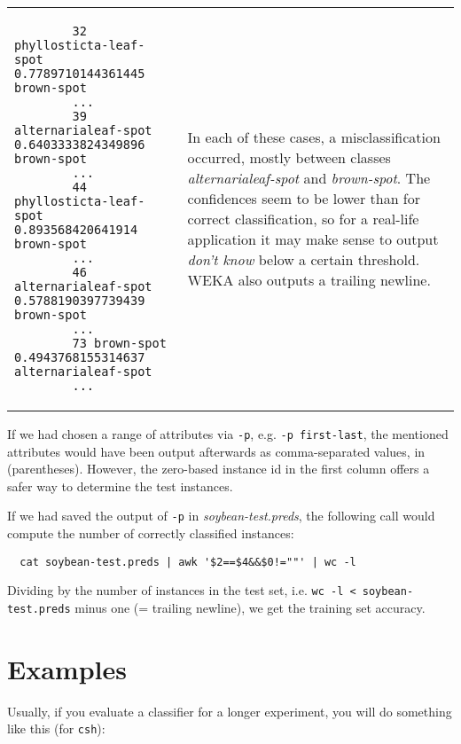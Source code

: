 \vspace{0.5cm}
\noindent
\begin{tabular}{l l}
	\begin{minipage}{8cm}
		{\scriptsize
		\begin{verbatim}
		32 phyllosticta-leaf-spot 0.7789710144361445 brown-spot
		...
		39 alternarialeaf-spot 0.6403333824349896 brown-spot
		...
		44 phyllosticta-leaf-spot 0.893568420641914 brown-spot
		...
		46 alternarialeaf-spot 0.5788190397739439 brown-spot
		...
		73 brown-spot 0.4943768155314637 alternarialeaf-spot
		...
		\end{verbatim}}
	\end{minipage}
	&
	\begin{minipage}{5cm}
	In each of these cases, a misclassification occurred, mostly between classes \textit{alternarialeaf-spot} and \textit{brown-spot}. The confidences seem to be lower than for correct classification, so for a real-life application it may make sense to output \textit{don't know} below a certain threshold. WEKA also outputs a trailing newline.
	\end{minipage}
	\\
\end{tabular}

\vspace{0.5cm}

If we had chosen a range of attributes via \texttt{-p}, e.g. \texttt{-p first-last}, the mentioned attributes would have been output afterwards as comma-separated values, in (parentheses). However, the zero-based instance id in the first column offers a safer way to determine the test instances.

If we had saved the output of \texttt{-p} in \textit{soybean-test.preds}, the following call would compute the number of correctly classified instances:

{\scriptsize
\begin{verbatim}
  cat soybean-test.preds | awk '$2==$4&&$0!=""' | wc -l
\end{verbatim}}

\noindent Dividing by the number of instances in the test set, i.e. \texttt{wc -l < soybean-test.preds} minus one (= trailing newline), we get the training set accuracy.

\section{Examples}

Usually, if you evaluate a classifier for a longer experiment, you will do something like this (for \texttt{csh}):

